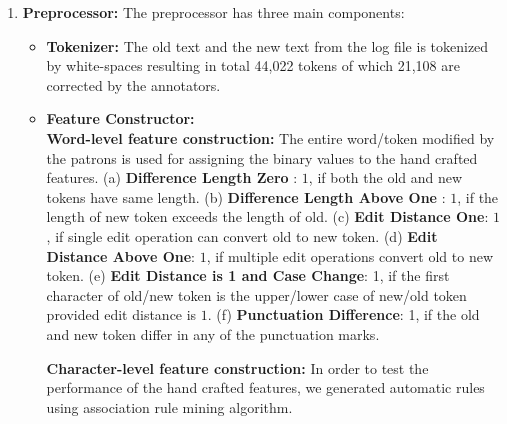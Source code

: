 \documentclass{acm_proc_article-sp}
\begin{document}
\begin{enumerate}
\item \textbf{Preprocessor: } The preprocessor has three main components:
\begin{itemize}
\item \textbf{Tokenizer: } The old text and the new text from the log file is tokenized by white-spaces resulting in total 44,022 tokens of which 21,108 are corrected by the annotators.
\item \textbf{Feature Constructor: }\\
\textbf{Word-level feature construction:} The entire word/token modified by the patrons is used for assigning the binary values to the hand crafted features.
(a) \textbf{Difference Length Zero} : $1$, if both the old and new tokens have same length.
(b) \textbf{Difference Length Above One} : $1$, if the length of new token exceeds the length of old.
(c) \textbf{Edit Distance One}:  $1$, if single edit operation can convert old to new token.
(d) \textbf{Edit Distance Above One}: $1$, if multiple edit operations convert old  to new token.
(e) \textbf{Edit Distance is 1 and Case Change}: 1, if the first character of old/new token is the upper/lower case of new/old token provided edit distance is $1$.
(f) \textbf{Punctuation Difference}: 1, if the old and new token differ in any of the punctuation marks.%

\textbf{Character-level feature construction:} In order to test the performance of the hand crafted features, we generated automatic rules using association rule mining algorithm.


\end{itemize}
\end{enumerate}
\end{document}
